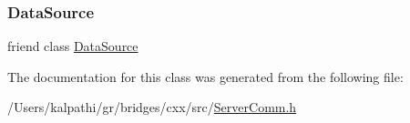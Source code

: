 \mbox{\label{classbridges_1_1_server_comm_a7998ddaa8bd7c3b9a7cd2a8cbf3573c4}} 
\subsubsection{\texorpdfstring{DataSource}{DataSource}}
{\footnotesize\ttfamily friend class \mbox{\hyperlink{classbridges_1_1_data_source}{Data\+Source}}\hspace{0.3cm}{\ttfamily [friend]}}



The documentation for this class was generated from the following file\+:\begin{DoxyCompactItemize}
\item 
/\+Users/kalpathi/gr/bridges/cxx/src/\mbox{\hyperlink{_server_comm_8h}{Server\+Comm.\+h}}\end{DoxyCompactItemize}
